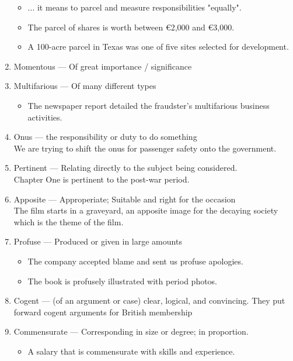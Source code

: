 \documentclass[oneside]{book}
\begin{document}
\begin{enumerate}
\begin{itemize}
        \item \(\ldots\) it means to parcel and measure responsibilities "equally".
        \item The parcel of shares is worth between €2,000 and €3,000.
        \item A 100-acre parcel in Texas was one of five sites selected for development.
    \end{itemize} \normalsize
    \item Momentous --- Of great importance / significance
    \item Multifarious --- Of many different types
    \begin{itemize}
        \item The newspaper report detailed the fraudster's multifarious business activities.
    \end{itemize}
    \item Onus --- the responsibility or duty to do something\\
    \footnotesize We are trying to shift the onus for passenger safety onto the government. \normalsize
    \item Pertinent --- Relating directly to the subject being considered.\\
    \footnotesize Chapter One is pertinent to the post-war period. \normalsize
    \item Apposite --- Approperiate; Suitable and right for the occasion\\
    \footnotesize The film starts in a graveyard, an apposite image for the decaying society which is the theme of the film. \normalsize 
    \item Profuse --- Produced or given in large amounts
    \footnotesize \begin{itemize}
        \item The company accepted blame and sent us profuse apologies.
        \item The book is profusely illustrated with period photos.
    \end{itemize} \normalsize
    \item Cogent --- (of an argument or case) clear, logical, and convincing.
        \footnotesize They put forward cogent arguments for British membership \normalsize
    \item Commensurate --- Corresponding in size or degree; in proportion.\\
    \begin{itemize}
        \item A salary that is commensurate with skills and experience.

\end{itemize}
\end{enumerate}
\end{document}
